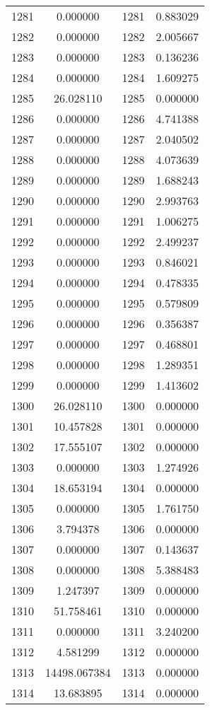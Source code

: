 \documentclass[12pt]{article}
\begin{document}
\begin{longtable}{@{}cccc@{}}
1281 & 0.000000 & 1281 & 0.883029 \\
1282 & 0.000000 & 1282 & 2.005667 \\
1283 & 0.000000 & 1283 & 0.136236 \\
1284 & 0.000000 & 1284 & 1.609275 \\
1285 & 26.028110 & 1285 & 0.000000 \\
1286 & 0.000000 & 1286 & 4.741388 \\
1287 & 0.000000 & 1287 & 2.040502 \\
1288 & 0.000000 & 1288 & 4.073639 \\
1289 & 0.000000 & 1289 & 1.688243 \\
1290 & 0.000000 & 1290 & 2.993763 \\
1291 & 0.000000 & 1291 & 1.006275 \\
1292 & 0.000000 & 1292 & 2.499237 \\
1293 & 0.000000 & 1293 & 0.846021 \\
1294 & 0.000000 & 1294 & 0.478335 \\
1295 & 0.000000 & 1295 & 0.579809 \\
1296 & 0.000000 & 1296 & 0.356387 \\
1297 & 0.000000 & 1297 & 0.468801 \\
1298 & 0.000000 & 1298 & 1.289351 \\
1299 & 0.000000 & 1299 & 1.413602 \\
1300 & 26.028110 & 1300 & 0.000000 \\
1301 & 10.457828 & 1301 & 0.000000 \\
1302 & 17.555107 & 1302 & 0.000000 \\
1303 & 0.000000 & 1303 & 1.274926 \\
1304 & 18.653194 & 1304 & 0.000000 \\
1305 & 0.000000 & 1305 & 1.761750 \\
1306 & 3.794378 & 1306 & 0.000000 \\
1307 & 0.000000 & 1307 & 0.143637 \\
1308 & 0.000000 & 1308 & 5.388483 \\
1309 & 1.247397 & 1309 & 0.000000 \\
1310 & 51.758461 & 1310 & 0.000000 \\
1311 & 0.000000 & 1311 & 3.240200 \\
1312 & 4.581299 & 1312 & 0.000000 \\
1313 & 14498.067384 & 1313 & 0.000000 \\
1314 & 13.683895 & 1314 & 0.000000 \\

\end{longtable}
\end{document}

